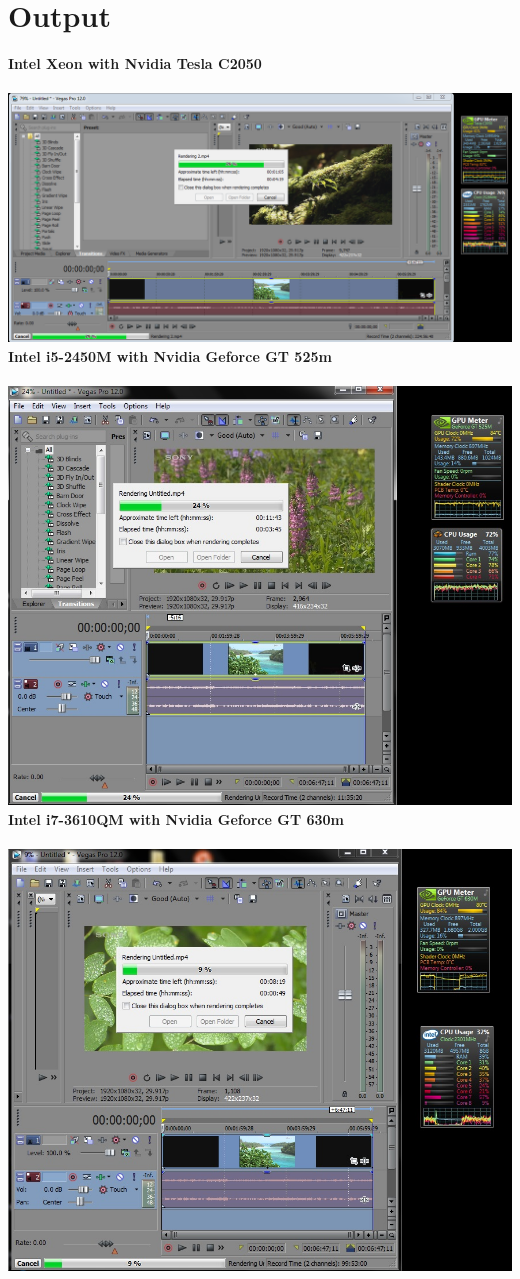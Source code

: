 \section{Output}
\textbf{Intel Xeon with Nvidia Tesla C2050}\\\\
\includegraphics [width=1.2\textwidth]{sony1.png}
\newpage
\textbf{Intel i5-2450M with Nvidia Geforce GT 525m}\\\\
\includegraphics [width=1.2\textwidth]{525m.jpg}\\
\newpage
\textbf{Intel i7-3610QM with Nvidia Geforce GT 630m}\\\\
\includegraphics [width=1.2\textwidth]{630m.jpg}

